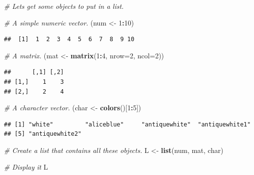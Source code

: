 \documentclass[
]{book}
\newenvironment{Shaded}{\begin{snugshade}}{\end{snugshade}}
\newcommand{\AttributeTok}[1]{\textcolor[rgb]{0.13,0.29,0.53}{#1}}
\newcommand{\CommentTok}[1]{\textcolor[rgb]{0.56,0.35,0.01}{\textit{#1}}}
\newcommand{\DecValTok}[1]{\textcolor[rgb]{0.00,0.00,0.81}{#1}}
\newcommand{\FunctionTok}[1]{\textcolor[rgb]{0.13,0.29,0.53}{\textbf{#1}}}
\newcommand{\NormalTok}[1]{#1}
\newcommand{\OtherTok}[1]{\textcolor[rgb]{0.56,0.35,0.01}{#1}}
\newcommand{\SpecialCharTok}[1]{\textcolor[rgb]{0.81,0.36,0.00}{\textbf{#1}}}
\begin{document}
\begin{Shaded}
\begin{Highlighting}[]
\CommentTok{\# Let\textquotesingle{}s get some objects to put in a list.}

\CommentTok{\# A simple numeric vector.}
\NormalTok{(num }\OtherTok{\textless{}{-}} \DecValTok{1}\SpecialCharTok{:}\DecValTok{10}\NormalTok{)}
\end{Highlighting}
\end{Shaded}

\begin{verbatim}
##  [1]  1  2  3  4  5  6  7  8  9 10
\end{verbatim}

\begin{Shaded}
\begin{Highlighting}[]
\CommentTok{\# A matrix.}
\NormalTok{(mat }\OtherTok{\textless{}{-}} \FunctionTok{matrix}\NormalTok{(}\DecValTok{1}\SpecialCharTok{:}\DecValTok{4}\NormalTok{, }\AttributeTok{nrow=}\DecValTok{2}\NormalTok{, }\AttributeTok{ncol=}\DecValTok{2}\NormalTok{))}
\end{Highlighting}
\end{Shaded}

\begin{verbatim}
##      [,1] [,2]
## [1,]    1    3
## [2,]    2    4
\end{verbatim}

\begin{Shaded}
\begin{Highlighting}[]
\CommentTok{\# A character vector.}
\NormalTok{(char }\OtherTok{\textless{}{-}} \FunctionTok{colors}\NormalTok{()[}\DecValTok{1}\SpecialCharTok{:}\DecValTok{5}\NormalTok{])}
\end{Highlighting}
\end{Shaded}

\begin{verbatim}
## [1] "white"         "aliceblue"     "antiquewhite"  "antiquewhite1"
## [5] "antiquewhite2"
\end{verbatim}

\begin{Shaded}
\begin{Highlighting}[]
\CommentTok{\# Create a list that contains all these objects.}
\NormalTok{L }\OtherTok{\textless{}{-}} \FunctionTok{list}\NormalTok{(num, mat, char)}

\CommentTok{\# Display it}
\NormalTok{L}
\end{Highlighting}
\end{Shaded}
\end{document}
